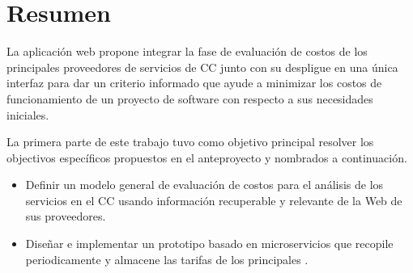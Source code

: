 

\begingroup
\let\clearpage\relax
\let\cleardoublepage\relax
\let\cleardoublepage\relax



\chapter*{Resumen}
La aplicación web \appName propone integrar la fase de evaluación de costos de los principales proveedores de servicios de \acrfull{CC} junto con su despligue en una única interfaz para dar un criterio informado que ayude a minimizar los costos de funcionamiento de un proyecto de software con respecto a sus necesidades iniciales.\bigskip

La primera parte de este trabajo tuvo como objetivo principal resolver los objectivos específicos propuestos en el anteproyecto y nombrados a continuación.

\begin{itemize}
    \item Definir un modelo general de evaluación de costos para el análisis de los servicios en el \acrshort{CC} usando información recuperable y relevante de la Web de sus proveedores.
    \item Diseñar e implementar un prototipo basado en microservicios que recopile periodicamente y almacene las tarifas de los principales .
\end{itemize}

\endgroup			

\vfill